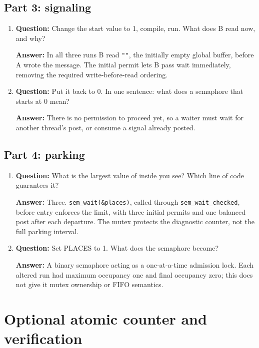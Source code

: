 \documentclass[12pt]{article}
\begin{document}
\subsection{Part 3: signaling}
\begin{enumerate}
\item \textbf{Question:} Change the start value to 1, compile, run. What does B read now, and why?
\par\textbf{Answer:} In all three runs B read \texttt{""}, the initially
empty global buffer, before A wrote the message. The initial permit lets
B pass wait immediately, removing the required write-before-read ordering.

\item \textbf{Question:} Put it back to 0. In one sentence: what does a semaphore that starts at 0 mean?
\par\textbf{Answer:} There is no permission to proceed yet, so a waiter
must wait for another thread's post, or consume a signal already posted.
\end{enumerate}

\subsection{Part 4: parking}
\begin{enumerate}
\item \textbf{Question:} What is the largest value of inside you see? Which line of code guarantees it?
\par\textbf{Answer:} Three. \texttt{sem\_wait(\&places)}, called through
\texttt{sem\_wait\_checked}, before entry enforces the limit, with three
initial permits and one balanced post after each departure. The mutex
protects the diagnostic counter, not the full parking interval.

\item \textbf{Question:} Set PLACES to 1. What does the semaphore become?
\par\textbf{Answer:} A binary semaphore acting as a one-at-a-time
admission lock. Each altered run had maximum occupancy one and final
occupancy zero; this does not give it mutex ownership or FIFO semantics.
\end{enumerate}

\clearpage
\section{Optional atomic counter and verification}
\end{document}
